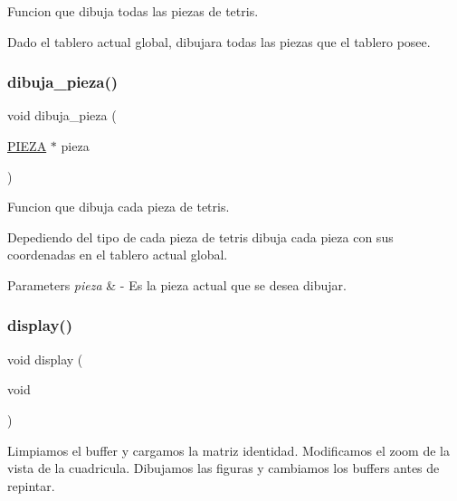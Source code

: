 Funcion que dibuja todas las piezas de tetris. 

Dado el tablero actual global, dibujara todas las piezas que el tablero posee. \mbox{\label{interfaz-grafica_8c_a5640fa261ed805f504d0bbffea24a1b7}} 
\subsubsection{\texorpdfstring{dibuja\+\_\+pieza()}{dibuja\_pieza()}}
{\footnotesize\ttfamily void dibuja\+\_\+pieza (\begin{DoxyParamCaption}\item[{\hyperlink{pieza_8h_aac4b603fd85c8ae53529fc00a88de8ae}{P\+I\+E\+ZA} $\ast$}]{pieza }\end{DoxyParamCaption})}



Funcion que dibuja cada pieza de tetris. 

Depediendo del tipo de cada pieza de tetris dibuja cada pieza con sus coordenadas en el tablero actual global. 
\begin{DoxyParams}{Parameters}
{\em pieza} & -\/ Es la pieza actual que se desea dibujar. \\
\hline
\end{DoxyParams}
\mbox{\label{interfaz-grafica_8c_a4ea013001a5fb47853d0fab8f8de35cd}} 
\subsubsection{\texorpdfstring{display()}{display()}}
{\footnotesize\ttfamily void display (\begin{DoxyParamCaption}\item[{void}]{ }\end{DoxyParamCaption})}

Limpiamos el buffer y cargamos la matriz identidad. Modificamos el zoom de la vista de la cuadricula. Dibujamos las figuras y cambiamos los buffers antes de repintar. \mbox{\label{interfaz-grafica_8c_a343542b85d5e7ca60f02b99f0231f526}} 
